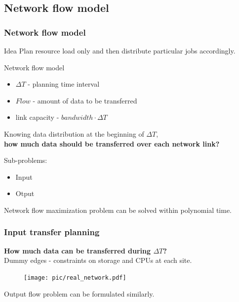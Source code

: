 \documentclass{beamer}
\begin{document}
\subsection{Network flow model}
\begin{frame}\frametitle{Network flow model} 
  \begin{block}{Idea}
    Plan resource load only and then distribute particular jobs accordingly.
  \end{block}

  \begin{block}{Network flow model}
    \begin{itemize}
      \item $\Delta T$ - planning time interval
      \item $Flow$ - amount of data to be transferred
      \item link capacity - $bandwidth \cdot \Delta T$
    \end{itemize}
  \end{block}    
  Knowing data distribution at the beginning of $\Delta T$,\\
  \textbf{how much data should be transferred over each network link?}
  
    \begin{block}{Sub-problems:}
    \begin{itemize}
      \item Input
      \item Otput
    \end{itemize}
  \end{block}  
  
  Network flow maximization problem can be solved within polynomial time.
\end{frame}

\begin{frame}\frametitle{Input transfer planning}
\textbf{How much data can be transferred during $\Delta T$?}\\
Dummy edges - constraints on  storage and CPUs at each site.
\vspace{-5mm}
\begin{figure}[h]
	\begin{center}
		\texttt{[image: pic/real\_network.pdf]}
	\end{center}
	\label{real_network}
\end{figure} 
\vspace{-3mm}
Output flow problem can be formulated similarly.
\end{frame}
\end{document}
